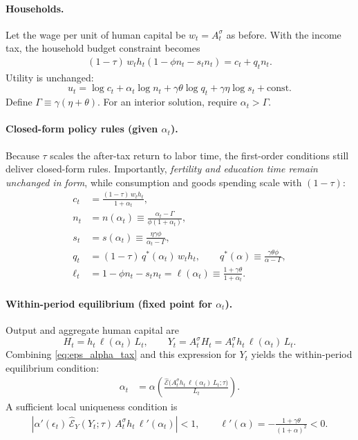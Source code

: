 \documentclass[11pt]{article}
\begin{document}
\paragraph{Households.}
Let the wage per unit of human capital be $w_t=A_t^\sigma$ as before.
With the income tax, the household budget constraint becomes
\begin{align}
(1-\tau)\,w_t h_t\left(1-\phi n_t-s_t n_t\right)=c_t+q_t n_t.
\label{eq:budget_tax}
\end{align}
Utility is unchanged:
\[
u_t=\log c_t + \alpha_t\log n_t +\gamma\theta\log q_t+\gamma\eta\log s_t+\text{const}.
\]
Define $\Gamma\equiv \gamma(\eta+\theta)$. For an interior solution, require $\alpha_t>\Gamma$.

\paragraph{Closed-form policy rules (given $\alpha_t$).}
Because $\tau$ scales the after-tax return to labor time, the first-order conditions still deliver closed-form rules.
Importantly, \emph{fertility and education time remain unchanged in form}, while consumption and goods spending scale with $(1-\tau)$:
\begin{align}
c_t &= \frac{(1-\tau)\,w_t h_t}{1+\alpha_t},
\label{eq:c_tax}\\[4pt]
n_t &= n(\alpha_t)\equiv\frac{\alpha_t-\Gamma}{\phi(1+\alpha_t)},
\label{eq:n_tax}\\[4pt]
s_t &= s(\alpha_t)\equiv \frac{\eta\gamma\phi}{\alpha_t-\Gamma},
\label{eq:s_tax}\\[4pt]
q_t &= (1-\tau)\,q^\ast(\alpha_t)\,w_t h_t,
\qquad
q^\ast(\alpha)\equiv \frac{\gamma\theta\phi}{\alpha-\Gamma},
\label{eq:q_tax}\\[4pt]
\ell_t &= 1-\phi n_t-s_t n_t=\ell(\alpha_t)\equiv \frac{1+\gamma\theta}{1+\alpha_t}.
\label{eq:ell_tax}
\end{align}

\paragraph{Within-period equilibrium (fixed point for $\alpha_t$).}
Output and aggregate human capital are
\[
H_t=h_t\,\ell(\alpha_t)\,L_t,
\qquad
Y_t=A_t^\sigma H_t=A_t^\sigma h_t\,\ell(\alpha_t)\,L_t.
\]
Combining \eqref{eq:eps_alpha_tax} and this expression for $Y_t$ yields the within-period equilibrium condition:
\begin{align}
\alpha_t
&=\alpha\!\left(
\frac{\widehat{\mathcal{E}}\!\Big(A_t^\sigma h_t\,\ell(\alpha_t)\,L_t;\tau\Big)}{L_t}
\right).
\label{eq:alpha_fp_tax}
\end{align}
A sufficient local uniqueness condition is
\begin{align}
\left|
\alpha'(\epsilon_t)\,
\widehat{\mathcal{E}}_Y(Y_t;\tau)\,
A_t^\sigma h_t\,
\ell'(\alpha_t)
\right|<1,
\qquad
\ell'(\alpha)=-\frac{1+\gamma\theta}{(1+\alpha)^2}<0.
\label{eq:uniqueness_tax}
\end{align}
\end{document}
